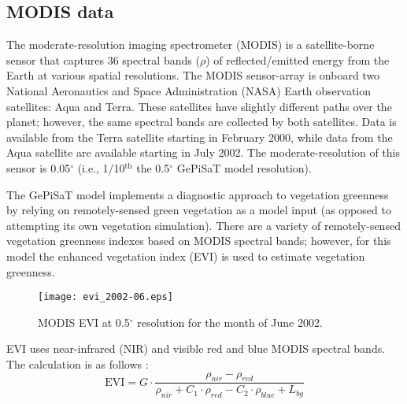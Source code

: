 \subsection{MODIS data}
\label{sec:gepmodis}
The moderate-resolution imaging spectrometer (MODIS) is a satellite-borne sensor that captures 36 spectral bands ($\rho$) of reflected/emitted energy from the Earth at various spatial resolutions.  
The MODIS sensor-array is onboard two National Aeronautics and Space Administration (NASA) Earth observation satellites: Aqua and Terra.  
These satellites have slightly different paths over the planet; however, the same spectral bands are collected by both satellites.  
Data is available from the Terra satellite starting in February 2000, while data from the Aqua satellite are available starting in July 2002.  
The moderate-resolution of this sensor is 0.05$^{\circ}$ (i.e., 1/10$^{\text{th}}$ the 0.5$^{\circ}$ GePiSaT model resolution).

The GePiSaT model implements a diagnostic approach to vegetation greenness by relying on remotely-sensed green vegetation as a model input (as opposed to attempting its own vegetation simulation).  
There are a variety of remotely-sensed vegetation greenness indexes based on MODIS spectral bands; however, for this model the enhanced vegetation index (EVI) is used to estimate vegetation greenness.
\begin{figure}[ht!]
    \texttt{[image: evi\_2002-06.eps]}
    \caption{MODIS EVI at 0.5$^{\circ}$ resolution for the month of June 
    2002.}
    \label{fig:modisevi}
\end{figure}

EVI uses near-infrared (NIR) and visible red and blue MODIS spectral bands.  
The calculation is as follows \parencite[Eq. 2]{huete02}:
%
%
\begin{equation}
\label{eq:evi}
    \text{EVI} = G \cdot \frac{\rho_{nir} - \rho_{red}}{\rho_{nir} + 
                 C_{1}\cdot\rho_{red} - C_{2}\cdot\rho_{blue} + L_{bg}}
\end{equation}

